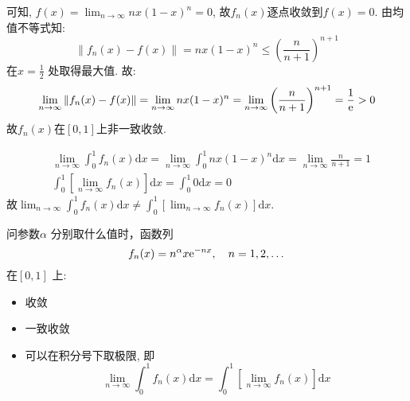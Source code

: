 \begin{solution}
    可知, \(f(x) = \lim_{n \to \infty} nx(1-x)^n = 0\),
    故\(f_{n}(x)\)逐点收敛到\(f(x) = 0\).
    由均值不等式知: \[
        \left\lVert f_{n}(x) - f(x) \right\rVert =
        nx(1-x)^{n} \le \left( \frac{n}{n + 1} \right)^{n+1}
    \]
    在\(x = \frac{1}{2}\) 处取得最大值.
    故: \[
        \lim_{n \to \infty} \left\lVert f_{n}(x) - f(x) \right\rVert
        = \lim_{n \to \infty} nx(1-x)^{n} = \lim_{n \to \infty}
        \left( \frac{n}{n + 1} \right)^{n+1} = \frac{1}{\mathrm{e}} > 0
    \]
    故\(f_{n}(x)\)在\([0,1]\)上非一致收敛.

    \begin{align*}
        & \lim_{n \to \infty} \int_0^1 f_n(x) \mathrm{d}x
        = \lim_{n \to \infty} \int_0^1 nx(1-x)^n \mathrm{d}x
        = \lim_{n \to \infty} \frac{n}{n+1} = 1
        \\
        & \int_0^1 \left[ \lim_{n \to \infty} f_n(x)
        \right] \mathrm{d}x
        = \int_0^1 0 \mathrm{d}x = 0
    \end{align*}
    故\(\lim_{n \to \infty} \int_0^1 f_n(x) \mathrm{d}x \neq \int_0^1
    \left[\lim_{n \to \infty} f_n(x) \right] \mathrm{d}x\).
\end{solution}

\begin{problem}
    问参数\(\alpha\) 分别取什么值时，函数列
    \[
        f_n(x) = n^\alpha x\mathrm{e}^{-n x}, \quad n = 1, 2, \dots
    \] 在\([0,1]\) 上:
    \begin{itemize}
        \item 收敛
        \item 一致收敛
        \item 可以在积分号下取极限, 即\[
                \lim_{n \to \infty} \int_0^1 f_n(x)
                \mathrm{d}x = \int_0^1
                \left[ \lim_{n \to \infty} f_n(x) \right] \mathrm{d}x
            \]
    \end{itemize}
\end{problem}

